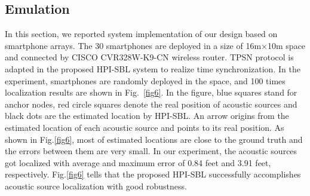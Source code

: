 

		

\subsection{Emulation}


In this section, we reported system implementation of our design based on smartphone arrays.
The 30 smartphones are deployed in a size of 16m$\times$10m space and connected by CISCO CVR328W-K9-CN wireless router.
TPSN protocol is adapted in the proposed HPI-SBL system to realize time synchronization.
In the experiment, smartphones are randomly deployed in the space, and 100 times localization results are shown in Fig.~\ref{fig6}. 
In the figure, blue squares stand for anchor
nodes, red circle squares denote the real position of acoustic sources and black dots are the estimated location by HPI-SBL. 
An arrow origins from the estimated location of each acoustic source and points to its real position. 
As shown in Fig.\ref{fig6}, most of estimated locations are close to the ground truth and the errors between them are very small.
In our experiment, the acoustic sources got localized with average and maximum error of 0.84 feet and 3.91 feet, respectively. Fig.\ref{fig6} tells that
the proposed HPI-SBL successfully accomplishes acoustic source localization with good robustness.

